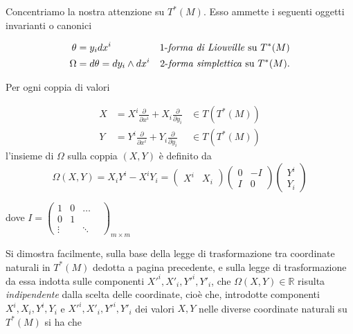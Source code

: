 Concentriamo la nostra attenzione su $ T^* (M) $. Esso ammette i seguenti oggetti invarianti o canonici

\begin{equation*}
\begin{aligned}
\theta &= y_i dx^i &\text{$ 1 $-\textit{forma di Liouville} su } T^* (M) \\
\Omega &= d\theta = dy_i \wedge dx^i &\text{$ 2 $-\textit{forma simplettica} su } T^* (M).
\end{aligned}
\end{equation*}

Per ogni coppia di valori

\begin{equation*}
\begin{aligned}
X &= X^i \frac{\partial}{\partial x^i} + X_i \frac{\partial}{\partial y_i} &\in T (T^* (M)) \\
Y &= Y^i \frac{\partial}{\partial x^i} + Y_i \frac{\partial}{\partial y_i} &\in T (T^* (M))
\end{aligned}
\end{equation*}
l'insieme di $ \Omega $ sulla coppia $ (X, Y) $ è definito da
\begin{equation*}
\Omega(X, Y) = X_i Y^i - X^i Y_i = 
\begin{pmatrix} X^i & X_i \end{pmatrix}
\begin{pmatrix} 0 & -I  \\  I & 0 \end{pmatrix}
\begin{pmatrix} Y^i \\ Y_i \end{pmatrix}
\end{equation*}

dove $ I = \begin{pmatrix} 1 & 0 & \dots \\ 0 & 1 & & \\  \vdots & & \ddots &  \end{pmatrix}_{m \times m}$ \medskip

Si dimostra facilmente, sulla base della legge di trasformazione tra coordinate naturali in $ T^*(M) $ dedotta a pagina precedente, e sulla legge di trasformazione da essa indotta sulle componenti $ X'^i, X'_i, Y'^i, Y'_i $, che $ \Omega (X, Y) \in \mathbb{R} $ risulta \textit{indipendente} dalla scelta delle coordinate, cioè che, introdotte componenti $ X^i, X_i, Y^i, Y_i $ e $ X'^i, X'_i, Y'^i, Y'_i $ dei valori $ X, Y $ nelle diverse coordinate naturali su $ T^* (M) $ si ha che

